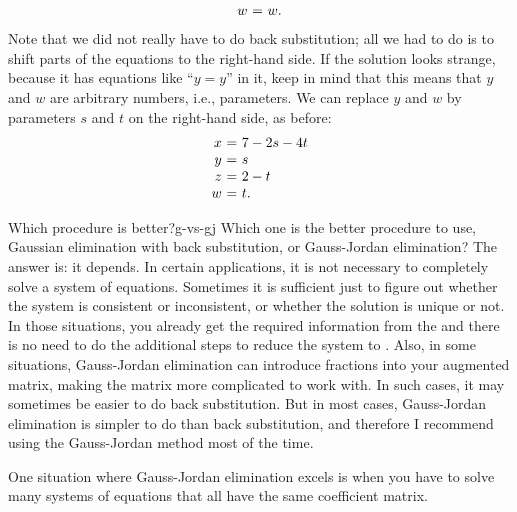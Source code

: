 \begin{solution}
\begin{equation*}
\begin{array}{r@{~}c@{~}l}
      w &=& w.
    \end{array}
  \end{equation*}
  Note that we did not really have to do back substitution; all we had
  to do is to shift parts of the equations to the right-hand side. If
  the solution looks strange, because it has equations like ``$y=y$''
  in it, keep in mind that this means that $y$ and $w$ are arbitrary
  numbers, i.e., parameters. We can replace $y$ and $w$ by parameters
  $s$ and $t$ on the right-hand side, as before:
  \begin{equation*}
    \begin{array}{r@{~}c@{~}l}
      x &=& 7-2s-4t \\
      y &=& s \\
      z &=& 2-t \\
      w &=& t.
    \end{array}
  \end{equation*}
\end{solution}

\begin{discussion}{Which procedure is better?}{g-vs-gj}
  Which one is the better procedure to use, Gaussian elimination with
  back substitution, or Gauss-Jordan elimination? The answer is: it
  depends. In certain applications, it is not necessary to completely
  solve a system of equations. Sometimes it is sufficient just to figure
  out whether the system is consistent or inconsistent, or whether the
  solution is unique or not. In those situations, you already get the
  required information from the {\ef} and there is no need to do the
  additional steps to reduce the system to {\rref}. Also, in some
  situations, Gauss-Jordan elimination can introduce fractions into your
  augmented matrix, making the matrix more complicated to work with. In
  such cases, it may sometimes be easier to do back substitution. But in
  most cases, Gauss-Jordan elimination is simpler to do than back
  substitution, and therefore I recommend using the Gauss-Jordan method
  most of the time.
\end{discussion}

One situation where Gauss-Jordan elimination excels is when you have
to solve many systems of equations that all have the same coefficient
matrix.

